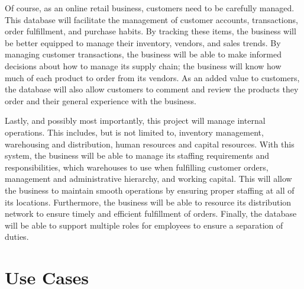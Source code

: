 \documentclass{article}
\let\oldsection\section
\renewcommand\section{\clearpage\oldsection}
\begin{document}
Of course, as an online retail business, customers need to be carefully managed.  This database will facilitate the management of customer accounts, transactions, order fulfillment, and purchase habits.  By tracking these items, the business will be better equipped to manage their inventory, vendors, and sales trends.  By managing customer transactions, the business will be able to make informed decisions about how to manage its supply chain; the business will know how much of each product to order from its vendors.  As an added value to customers, the database will also allow customers to comment and review the products they order and their general experience with the business.

Lastly, and possibly most importantly, this project will manage internal operations.  This includes, but is not limited to, inventory management, warehousing and distribution, human resources and capital resources.  With this system, the business will be able to manage its staffing requirements and responsibilities, which warehouses to use when fulfilling customer orders, management and administrative hierarchy, and working capital.  This will allow the business to maintain smooth operations by ensuring proper staffing at all of its locations.  Furthermore, the business will be able to resource its distribution network to ensure timely and efficient fulfillment of orders.  Finally, the database will be able to support multiple roles for employees to ensure a separation of duties.

\section{Use Cases}
\end{document}
